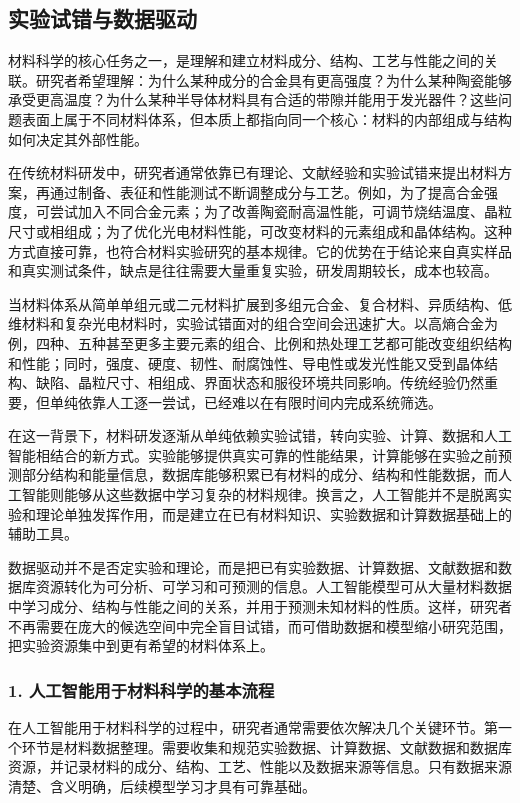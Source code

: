 \subsection{实验试错与数据驱动}

材料科学的核心任务之一，是理解和建立材料成分、结构、工艺与性能之间的关联。研究者希望理解：为什么某种成分的合金具有更高强度？为什么某种陶瓷能够承受更高温度？为什么某种半导体材料具有合适的带隙并能用于发光器件？这些问题表面上属于不同材料体系，但本质上都指向同一个核心：材料的内部组成与结构如何决定其外部性能。


在传统材料研发中，研究者通常依靠已有理论、文献经验和实验试错来提出材料方案，再通过制备、表征和性能测试不断调整成分与工艺。例如，为了提高合金强度，可尝试加入不同合金元素；为了改善陶瓷耐高温性能，可调节烧结温度、晶粒尺寸或相组成；为了优化光电材料性能，可改变材料的元素组成和晶体结构。这种方式直接可靠，也符合材料实验研究的基本规律。它的优势在于结论来自真实样品和真实测试条件，缺点是往往需要大量重复实验，研发周期较长，成本也较高。


当材料体系从简单单组元或二元材料扩展到多组元合金、复合材料、异质结构、低维材料和复杂光电材料时，实验试错面对的组合空间会迅速扩大。以高熵合金为例，四种、五种甚至更多主要元素的组合、比例和热处理工艺都可能改变组织结构和性能；同时，强度、硬度、韧性、耐腐蚀性、导电性或发光性能又受到晶体结构、缺陷、晶粒尺寸、相组成、界面状态和服役环境共同影响。传统经验仍然重要，但单纯依靠人工逐一尝试，已经难以在有限时间内完成系统筛选。


在这一背景下，材料研发逐渐从单纯依赖实验试错，转向实验、计算、数据和人工智能相结合的新方式。实验能够提供真实可靠的性能结果，计算能够在实验之前预测部分结构和能量信息，数据库能够积累已有材料的成分、结构和性能数据，而人工智能则能够从这些数据中学习复杂的材料规律。换言之，人工智能并不是脱离实验和理论单独发挥作用，而是建立在已有材料知识、实验数据和计算数据基础上的辅助工具。


数据驱动并不是否定实验和理论，而是把已有实验数据、计算数据、文献数据和数据库资源转化为可分析、可学习和可预测的信息。人工智能模型可从大量材料数据中学习成分、结构与性能之间的关系，并用于预测未知材料的性质。这样，研究者不再需要在庞大的候选空间中完全盲目试错，而可借助数据和模型缩小研究范围，把实验资源集中到更有希望的材料体系上。


\subsubsection*{\textbf{1. 人工智能用于材料科学的基本流程}}

在人工智能用于材料科学的过程中，研究者通常需要依次解决几个关键环节。第一个环节是材料数据整理。需要收集和规范实验数据、计算数据、文献数据和数据库资源，并记录材料的成分、结构、工艺、性能以及数据来源等信息。只有数据来源清楚、含义明确，后续模型学习才具有可靠基础。

